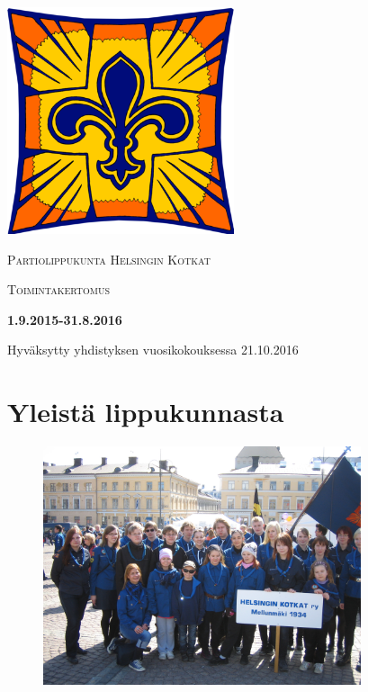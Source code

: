 \documentclass[a4paper, 12pt, finnish]{report} %
\begin{document}
\begin{titlepage}
	\centering
	\includegraphics[width=0.5\textwidth]{heko.png}\par\vspace{1cm}
	{\scshape\LARGE Partiolippukunta Helsingin Kotkat \par}
	\vspace{1cm}
	{\scshape\Large Toimintakertomus\par}
	\vspace{1.5cm}
	{\huge\bfseries 1.9.2015-31.8.2016\par}
	\vspace{2cm}
	\vfill
	\vfill
	{\large Hyväksytty yhdistyksen vuosikokouksessa 21.10.2016}
\end{titlepage}
\tableofcontents
\newpage
\section{Yleistä lippukunnasta}
\begin{figure}[htb]
	\begin{center}
		\includegraphics[height=7cm]{paraatissa.jpg}
	\end{center}
	\captionsetup{labelformat=empty}
\end{figure}
\end{document}
